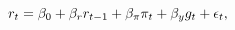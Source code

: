\begin{equation} \label{eq:TaylorRule}
	r_{t} = \beta_{0} + \beta_{r} r_{t-1} + \beta_{\pi} \pi_{t} + \beta_{y} g_{t} + \epsilon_{t},
\end{equation}